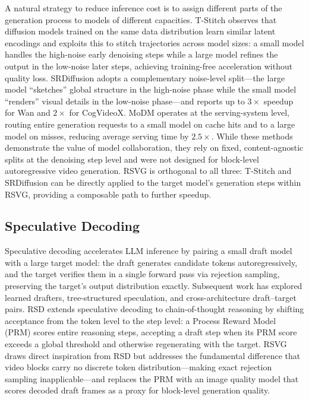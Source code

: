 \documentclass{article}
\begin{document}
A natural strategy to reduce inference cost is to assign different parts of
the generation process to models of different capacities.
T-Stitch \citep{tstitch2024} observes that diffusion models trained on the
same data distribution learn similar latent encodings and exploits this to
stitch trajectories across model sizes: a small model handles the
high-noise early denoising steps while a large model refines the output
in the low-noise later steps, achieving training-free acceleration without
quality loss.
SRDiffusion \citep{srdiffusion2025} adopts a complementary noise-level
split---the large model ``sketches'' global structure in the high-noise
phase while the small model ``renders'' visual details in the low-noise
phase---and reports up to $3\times$ speedup for Wan and $2\times$ for
CogVideoX.
MoDM \citep{modm2025} operates at the serving-system level, routing entire
generation requests to a small model on cache hits and to a large model
on misses, reducing average serving time by $2.5\times$.
While these methods demonstrate the value of model collaboration, they
rely on fixed, content-agnostic splits at the denoising step level and
were not designed for block-level autoregressive video generation.
RSVG is orthogonal to all three: T-Stitch and SRDiffusion can be directly
applied to the target model's generation steps within RSVG, providing a
composable path to further speedup.

\subsection{Speculative Decoding}

Speculative decoding \citep{leviathan2023fast,chen2023accelerating}
accelerates LLM inference by pairing a small draft model with a large
target model: the draft generates candidate tokens autoregressively, and
the target verifies them in a single forward pass via rejection sampling,
preserving the target's output distribution exactly.
Subsequent work has explored learned drafters, tree-structured speculation,
and cross-architecture draft--target pairs.
RSD \citep{rsd2025} extends speculative decoding to chain-of-thought
reasoning by shifting acceptance from the token level to the step level:
a Process Reward Model (PRM) scores entire reasoning steps, accepting a
draft step when its PRM score exceeds a global threshold and otherwise
regenerating with the target.
RSVG draws direct inspiration from RSD but addresses the fundamental
difference that video blocks carry no discrete token distribution---making
exact rejection sampling inapplicable---and replaces the PRM with an
image quality model that scores decoded draft frames as a proxy for
block-level generation quality.
\end{document}
